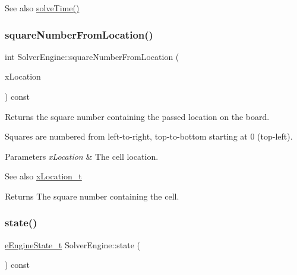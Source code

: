\begin{DoxySeeAlso}{See also}
\mbox{\hyperlink{class_solver_engine_aac9c7fba1a049fe08bcfd341700840fb}{solve\+Time()}} 
\end{DoxySeeAlso}
\mbox{\label{class_solver_engine_a3b515701f25827a9d817e7ca529f9b80}} 
\subsubsection{\texorpdfstring{square\+Number\+From\+Location()}{squareNumberFromLocation()}}
{\footnotesize\ttfamily int Solver\+Engine\+::square\+Number\+From\+Location (\begin{DoxyParamCaption}\item[{const \mbox{\hyperlink{struct_solver_engine_1_1x_location__t}{x\+Location\+\_\+t}} \&}]{x\+Location }\end{DoxyParamCaption}) const\hspace{0.3cm}{\ttfamily [private]}}



Returns the square number containing the passed location on the board. 

Squares are numbered from left-\/to-\/right, top-\/to-\/bottom starting at 0 (top-\/left). 
\begin{DoxyParams}{Parameters}
{\em x\+Location} & The cell location. \\
\hline
\end{DoxyParams}
\begin{DoxySeeAlso}{See also}
\mbox{\hyperlink{struct_solver_engine_1_1x_location__t}{x\+Location\+\_\+t}} 
\end{DoxySeeAlso}
\begin{DoxyReturn}{Returns}
The square number containing the cell. 
\end{DoxyReturn}
\mbox{\label{class_solver_engine_a74305814124ef4b1ff74b082b53d155c}} 
\subsubsection{\texorpdfstring{state()}{state()}}
{\footnotesize\ttfamily \mbox{\hyperlink{class_solver_engine_acd25f3521e492d4aa924f922396bf02c}{e\+Engine\+State\+\_\+t}} Solver\+Engine\+::state (\begin{DoxyParamCaption}{ }\end{DoxyParamCaption}) const\hspace{0.3cm}{\ttfamily [inline]}}



